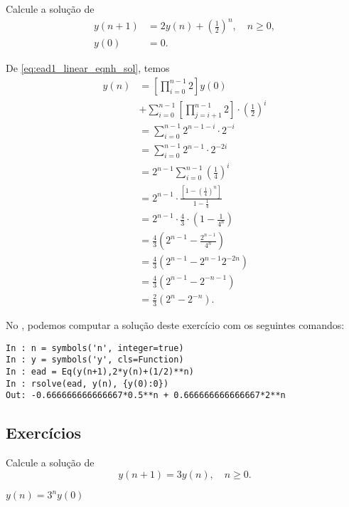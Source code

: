 \begin{exeresol}
  Calcule a solução de
  \begin{align}
    y(n+1) &= 2y(n) + \left(\frac{1}{2}\right)^n,\quad n\geq 0, \\
    y(0) &= 0.
  \end{align}
\end{exeresol}
\begin{resol}
  De \eqref{eq:ead1_linear_eqnh_sol}, temos
\begin{align}
  y(n) &= \left[\prod_{i=0}^{n-1} 2\right]y(0) \nonumber\\
       &+ \sum_{i=0}^{n-1}\left[\prod_{j=i+1}^{n-1} 2\right]\cdot\left(\frac{1}{2}\right)^i \\
       &= \sum_{i=0}^{n-1} 2^{n-1-i}\cdot 2^{-i} \\
       &= \sum_{i=0}^{n-1} 2^{n-1}\cdot 2^{-2i} \\
       &= 2^{n-1}\sum_{i=0}^{n-1}\left(\frac{1}{4}\right)^{i} \\
       &= 2^{n-1}\cdot \frac{\left[1-\left(\frac{1}{4}\right)^n\right]}{1-\frac{1}{4}} \\
       &=2^{n-1}\cdot\frac{4}{3}\cdot\left(1-\frac{1}{4^n}\right)\\
       &= \frac{4}{3}\left(2^{n-1} - \frac{2^{n-1}}{4^n}\right)\\
       &= \frac{4}{3}\left(2^{n-1} - 2^{n-1}2^{-2n}\right)\\
       &= \frac{4}{3}\left(2^{n-1}-2^{-n-1}\right)\\
       &= \frac{2}{3}\left(2^n-2^{-n}\right).
\end{align}

  \ifispython
  No \python, podemos computar a solução deste exercício com os seguintes comandos:
\begin{verbatim}
In : n = symbols('n', integer=true)
In : y = symbols('y', cls=Function)
In : ead = Eq(y(n+1),2*y(n)+(1/2)**n)
In : rsolve(ead, y(n), {y(0):0})
Out: -0.666666666666667*0.5**n + 0.666666666666667*2**n
\end{verbatim}
  \fi  
\end{resol}

\subsection*{Exercícios}

\begin{exer}
  Calcule a solução de
  \begin{equation}
    y(n+1) = 3y(n),\quad n\geq 0.
  \end{equation}
\end{exer}
\begin{resp}
  $y(n) = 3^ny(0)$
\end{resp}

